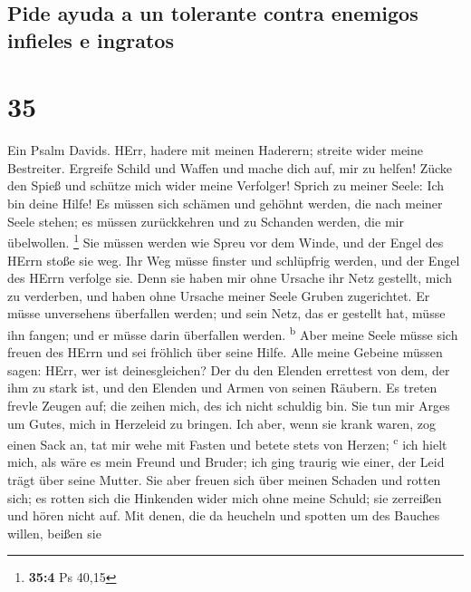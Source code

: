 \hypertarget{pide-ayuda-a-un-tolerante-contra-enemigos-infieles-e-ingratos}{%
\subsection{Pide ayuda a un tolerante contra enemigos infieles e
ingratos}\label{pide-ayuda-a-un-tolerante-contra-enemigos-infieles-e-ingratos}}

\hypertarget{section-34}{%
\section{35}\label{section-34}}

 Ein Psalm Davids. HErr, hadere mit meinen Haderern;
streite wider meine Bestreiter.  Ergreife Schild und
Waffen und mache dich auf, mir zu helfen!  Zücke den Spieß
und schütze mich wider meine Verfolger! Sprich zu meiner Seele: Ich bin
deine Hilfe!  Es müssen sich schämen und gehöhnt werden,
die nach meiner Seele stehen; es müssen zurückkehren und zu Schanden
werden, die mir übelwollen. \footnote{\textbf{35:4} Ps 40,15}
 Sie müssen werden wie Spreu vor dem Winde, und der Engel
des HErrn stoße sie weg.  Ihr Weg müsse finster und
schlüpfrig werden, und der Engel des HErrn verfolge sie. 
Denn sie haben mir ohne Ursache ihr Netz gestellt, mich zu verderben,
und haben ohne Ursache meiner Seele Gruben zugerichtet. 
Er müsse unversehens überfallen werden; und sein Netz, das er gestellt
hat, müsse ihn fangen; und er müsse darin überfallen werden.
\textsuperscript{b}  Aber meine Seele müsse sich freuen
des HErrn und sei fröhlich über seine Hilfe.  Alle meine
Gebeine müssen sagen: HErr, wer ist deinesgleichen? Der du den Elenden
errettest von dem, der ihm zu stark ist, und den Elenden und Armen von
seinen Räubern.  Es treten frevle Zeugen auf; die zeihen
mich, des ich nicht schuldig bin.  Sie tun mir Arges um
Gutes, mich in Herzeleid zu bringen.  Ich aber, wenn sie
krank waren, zog einen Sack an, tat mir wehe mit Fasten und betete stets
von Herzen; \textsuperscript{c}  ich hielt mich, als wäre
es mein Freund und Bruder; ich ging traurig wie einer, der Leid trägt
über seine Mutter.  Sie aber freuen sich über meinen
Schaden und rotten sich; es rotten sich die Hinkenden wider mich ohne
meine Schuld; sie zerreißen und hören nicht auf.  Mit
denen, die da heucheln und spotten um des Bauches willen, beißen sie
